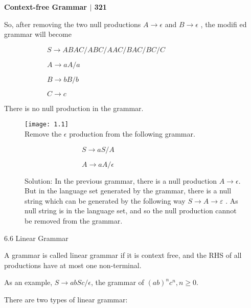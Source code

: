 \documentclass[10pt,a4paper]{book}
\begin{document}
\footnotesize

\begin{flushright}
  \textsf{\textbf{Context-free Grammar $|$ 321}}
\end{flushright}

\begin{flushleft}
So, after removing the two null productions $ A \rightarrow \epsilon $ and $ B \rightarrow \epsilon $ , the modifi ed grammar will become
\end{flushleft}

 $\qquad\qquad\qquad S \rightarrow ABAC/ABC/AAC/BAC/BC/C$
 
 $\qquad\qquad\qquad A \rightarrow aA/a$ 
 
 $\qquad\qquad\qquad B \rightarrow bB/b$ 
 
 $\qquad\qquad\qquad C \rightarrow c$ 
 
\begin{flushleft}
There is no null production in the grammar.
\end{flushleft}

\begin{flushleft}
\begin{figure}[h]
  \texttt{[image: 1.1]}\\Remove the $\epsilon$ production from the following grammar.
  
  $\qquad\qquad\qquad\qquad S \rightarrow aS/A$
  
  $\qquad\qquad\qquad\qquad A \rightarrow aA/\epsilon$
  
  Solution: In the previous grammar, there is a null production $A \rightarrow \epsilon$. But in the language set generated by the grammar, there is a null string which can be generated by the following way $S \rightarrow A \rightarrow \varepsilon$ . As null string is in the language set, and so the null production cannot be removed from the grammar.
\end{figure}
\end{flushleft}
\begin{flushleft}
\Large 6.6 \; Linear Grammar
\end{flushleft}
\begin{flushleft}
A grammar is called linear grammar if it is context free, and the RHS of all productions have at most one non-terminal.
\end{flushleft}
As an example, $S \rightarrow abSc/\epsilon$, the grammar of $(ab)^{n}c^{n}, n \geq 0$.

\!\!\!\!\!\!\!\!\!\!There are two types of linear grammar:
\end{document}
